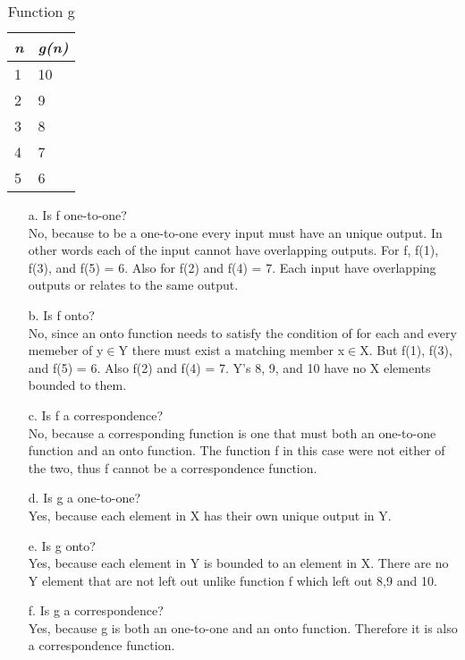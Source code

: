 \documentclass{scrartcl}
\begin{document}
\begin{enumerate}
		\begin{table}[htb!]
			\centering
			\caption{Function g}
			\label{my-label}
			\begin{tabular}{|l|l|}
			\hline
				\textit{n} & \textit{g(n)} \\ \hline
				1 & 10 \\ \hline
				2 & 9 \\ \hline
				3 & 8 \\ \hline
				4 & 7 \\ \hline
				5 & 6 \\ \hline
			\end{tabular}
		\end{table}
		\begin{enumerate}
			\item[a.] Is f one-to-one?\\
								No, because to be a one-to-one every input must have an unique output. In other words each of the input cannot have overlapping outputs. For f, f(1), f(3), and f(5) = 6. Also for f(2) and f(4) = 7. Each input have overlapping outputs or relates to the same output.
			\item[b.] Is f onto? \\ 
								No, since an onto function needs to satisfy the condition of for each and every memeber of y$\in$Y there must exist a matching member x$\in$X. But f(1), f(3), and f(5) = 6. Also f(2) and f(4) = 7. Y's 8, 9, and 10 have no X elements bounded to them. 
			\item[c.] Is f a correspondence? \\ 
								No, because a corresponding function is one that must both an one-to-one function and an onto function. The function f in this case were not either of the two, thus f cannot be a correspondence function. 
			\item[d.] Is g a one-to-one?\\
								Yes, because each element in X has their own unique output in Y. 
			\item[e.] Is g onto?\\
								Yes, because each element in Y is bounded to an element in X. There are no Y element that are not left out unlike function f which left out 8,9 and 10. 
			\item[f.] Is g a correspondence? \\
								Yes, because g is both an one-to-one and an onto function. Therefore it is also a correspondence function.
			

\end{enumerate}
\end{enumerate}
\end{document}
